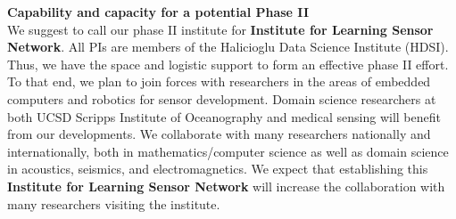 \documentclass{article}
\begin{document}
\vspace{1cm}
{\bf Capability and capacity for a potential Phase II}\\
We suggest to call our phase II institute for {\bf Institute for  Learning Sensor Network}.
All PIs are members of the Halicioglu Data Science Institute (HDSI). Thus, we have the space and logistic support to form an effective phase II effort. To that end, we plan to join forces with researchers in the areas of embedded
computers and  robotics for sensor development. Domain science researchers  at both UCSD Scripps Institute of Oceanography and medical sensing will benefit from our developments. We collaborate with many researchers nationally and  internationally, both in mathematics/computer science as well as domain science in acoustics, seismics, and electromagnetics. We expect that establishing this {\bf Institute for  Learning Sensor Network} will increase the collaboration with many researchers visiting the institute.

\vspace{1cm}


    
\end{document}
